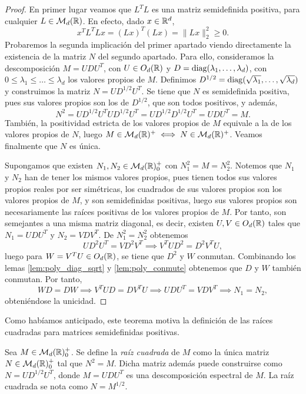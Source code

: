 \begin{proof}
    En primer lugar veamos que $L^TL$ es una matriz semidefinida positiva, para cualquier $L \in \mathcal{M}_d(\mathbb{R})$. En efecto, dado $x \in \mathbb{R}^d$,
    \[ x^TL^TLx = (Lx)^T(Lx) = \|Lx\|^2_2 \ge 0. \]
    Probaremos la segunda implicación del primer apartado viendo directamente la existencia de la matriz $N$ del segundo apartado. Para ello, consideramos la descomposición $M = UDU^T$, con $U \in O_d(\mathbb{R})$ y $D = \operatorname{diag}(\lambda_1,\dots,\lambda_d)$, con $0 \le \lambda_1 \le \dots \le \lambda_d$ los valores propios de $M$. Definimos $D^{1/2} = \operatorname{diag}(\sqrt{\lambda_1},\dots,\sqrt{\lambda_d})$ y construimos la matriz $N = UD^{1/2}U^T$. Se tiene que $N$ es semidefinida positiva, pues sus valores propios son los de $D^{1/2}$, que son todos positivos, y además, 
    \[N^2 = UD^{1/2}U^TUD^{1/2}U^T = UD^{1/2}D^{1/2}U^T = UDU^T = M.\]
    También, la positividad estricta de los valores propios de $M$ equivale a la de los valores propios de $N$, luego $M \in \mathcal{M}_d(\mathbb{R})^+ \iff N \in \mathcal{M}_d(\mathbb{R})^+$. Veamos finalmente que $N$ es única.

    Supongamos que existen $N_1, N_2 \in \mathcal{M}_d(\mathbb{R})^+_0$ con $N_1^2 = M = N_2^2$. Notemos que $N_1$ y $N_2$ han de tener los mismos valores propios, pues tienen todos sus valores propios reales por ser simétricas, los cuadrados de sus valores propios son los valores propios de $M$, y son semidefinidas positivas, luego sus valores propios son necesariamente las raíces positivas de los valores propios de $M$. Por tanto, son semejantes a una misma matriz diagonal, es decir, existen $U, V \in O_d(\mathbb{R})$ tales que $N_1 = UDU^T$ y $N_2 = VDV^T$. De $N_1^2 = N_2^2$ obtenemos
    \[ UD^2U^T = VD^2V^T \implies V^TUD^2 = D^2V^TU, \]
    luego para $W = V^TU \in O_d(\mathbb{R})$, se tiene que $D^2$ y $W$ conmutan. Combinando los lemas \ref{lem:poly_diag_sqrt} y \ref{lem:poly_conmute} obtenemos que $D$ y $W$ también conmutan. Por tanto,
    \[WD = DW \implies V^TUD = DV^TU \implies UDU^T = VDV^T \implies N_1 = N_2, \]
    obteniéndose la unicidad.
\end{proof}

Como habíamos anticipado, este teorema motiva la definición de las raíces cuadradas para matrices semidefinidas positivas.

\begin{definition}
    Sea $M \in \mathcal{M}_d(\mathbb{R})^+_0$. Se define la \emph{raíz cuadrada} de $M$ como la única matriz $N \in \mathcal{M}_d(\mathbb{R})^+_0$ tal que $N^2 = M$. Dicha matriz además puede construirse como $N = UD^{1/2}U^T$, donde $M = UDU^T$ es una descomposición espectral de $M$. La raíz cuadrada se nota como $N = M^{1/2}$.
\end{definition}

